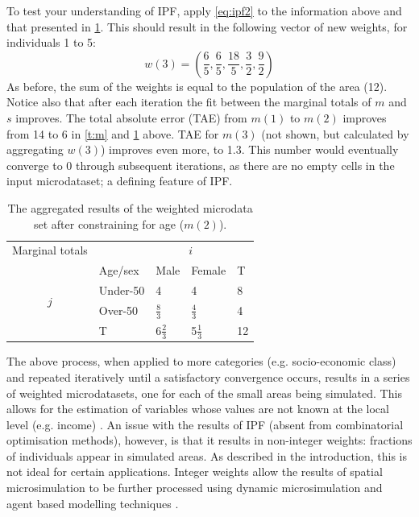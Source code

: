 \documentclass[a4paper,10pt]{article}
\begin{document}
To test your understanding of IPF, apply \cref{eq:ipf2} to the information above
and that presented in \cref{t:m2}.
This should result in the following vector of new weights, for individuals 1 to 5:
\begin{equation}
  w(3) = (\frac{6}{5}, \frac{6}{5}, \frac{18}{5}, \frac{3}{2}, \frac{9}{2})
\end{equation}
As before, the sum of the weights is equal to the population of the area (12).
Notice also that after each iteration the fit between the marginal
totals of $m$ and $s$
improves. The total absolute error (TAE)
from $m(1)$ to $m(2)$ improves from
14 to 6 in \cref{t:m} and \cref{t:m2} above. TAE for $m(3)$ (not shown,
but calculated by aggregating $w(3)$) improves even more, to 1.3.
This number would eventually converge to 0 through subsequent
iterations, as there are no empty cells in the input microdataset;
a defining feature of IPF.


\begin{table}[htbp]
\centering
\caption[Aggregated results after constraining for age]{The
aggregated results of the weighted
microdata set after constraining for age ($m(2)$).
}

\begin{tabular}{cllll}\toprule
Marginal totals&  & \multicolumn{2}{c}{$i$} & \\
& Age/sex & Male & Female & T\\ \midrule
\multirow{2}{*}{$j$} & Under-50 & 4 & 4 & 8\\
& Over-50 & $\frac{8}{3}$ & $\frac{4}{3}$ & 4 \\
& T & $6\frac{2}{3}$ & 5$\frac{1}{3}$ & 12\\
\bottomrule
\end{tabular}
\label{t:m2}
\end{table}

The above process, when applied to more categories (e.g. socio-economic class)
and repeated iteratively until a satisfactory convergence occurs, results in a
series of weighted microdatasets, one for each of the small areas being
simulated. This allows for the estimation of variables whose values are not
known at the local level (e.g. income) \citep{Ballas2005c}. An issue
with the results of IPF (absent from combinatorial optimisation methods),
however, is that it results in non-integer weights: fractions of individuals
appear in simulated areas. As described in the introduction, this is not ideal
for certain applications. Integer weights allow the results of spatial
microsimulation to be further processed using dynamic microsimulation and agent
based modelling techniques \citep{Pritchard2012}.
\end{document}
